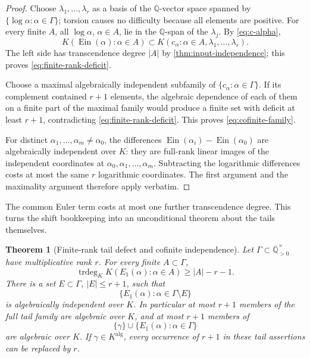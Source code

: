 \documentclass[11pt]{article}
\theoremstyle{keio}
\newtheorem{theorem}{Theorem}[section]
\theoremstyle{definition}
\theoremstyle{remark}
\newcommand{\Q}{\mathbb Q}
\newcommand{\Qbar}{\overline{\mathbb Q}}
\newcommand{\Ein}{\operatorname{Ein}}
\newcommand{\trdeg}{\operatorname{trdeg}}
\begin{document}
\begin{proof}
Choose \(\lambda_1,\ldots,\lambda_r\) as a basis of the \(\Q\)-vector space
spanned by \(\{\log\alpha:\alpha\in\Gamma\}\); torsion causes no difficulty
because all elements are positive.  For every finite \(A\), all
\(\log\alpha\), \(\alpha\in A\), lie in the \(\Q\)-span of the
\(\lambda_j\).  By \eqref{eq:c-alpha},
\[
 K(\Ein(\alpha):\alpha\in A)
 \subset K(c_\alpha:\alpha\in A,\lambda_1,\ldots,\lambda_r).
\]
The left side has transcendence degree \(|A|\) by
\cref{thm:input-independence}; this proves \eqref{eq:finite-rank-deficit}.

Choose a maximal algebraically independent subfamily of
\(\{c_\alpha:\alpha\in\Gamma\}\).  If its complement contained
\(r+1\) elements, the algebraic dependence of each of them on a finite part
of the maximal family would produce a finite set with deficit at least
\(r+1\), contradicting \eqref{eq:finite-rank-deficit}.  This proves
\eqref{eq:cofinite-family}.

For distinct \(\alpha_1,\ldots,\alpha_m\ne\alpha_0\), the differences
\(\Ein(\alpha_i)-\Ein(\alpha_0)\) are algebraically independent over \(K\):
they are full-rank linear images of the independent coordinates at
\(\alpha_0,\alpha_1,\ldots,\alpha_m\).  Subtracting the logarithmic
differences costs at most the same \(r\) logarithmic coordinates.  The first
argument and the maximality argument therefore apply verbatim.
\end{proof}

The common Euler term costs at most one further transcendence degree.  This
turns the shift bookkeeping into an unconditional theorem about the tails
themselves.

\begin{theorem}[Finite-rank tail defect and cofinite independence]
\label{thm:E1-cofinite}
Let \(\Gamma\subset\Qbar_{>0}^{\times}\) have multiplicative rank \(r\).
For every finite \(A\subset\Gamma\),
\begin{equation}\label{eq:E1-finite-rank-defect}
 \boxed{\displaystyle
 \trdeg_KK(E_1(\alpha):\alpha\in A)\ge |A|-r-1.}
\end{equation}
There is a set \(E\subset\Gamma\), \(|E|\le r+1\), such that
\begin{equation}\label{eq:E1-cofinite}
 \{E_1(\alpha):\alpha\in\Gamma\setminus E\}
\end{equation}
is algebraically independent over \(K\).  In particular at most \(r+1\)
members of the full tail family are algebraic over \(K\), and at most
\(r+1\) members of
\[
 \{\gamma\}\cup\{E_1(\alpha):\alpha\in\Gamma\}
\]
are algebraic over \(K\).  If \(\gamma\in K^{\mathrm{alg}}\), every
occurrence of \(r+1\) in these tail assertions can be replaced by \(r\).
\end{theorem}
\end{document}
